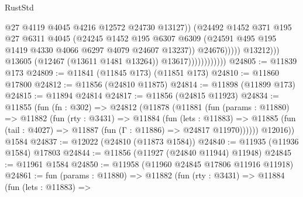\begin{lexlean}{RustStd}
\begin{coremodule}
                                              @27
                                              @4119
                                              @4045
                                              @4216
                                              @12572
                                              @24730
                                              @13127))
                                          (@24492
                                            @1452
                                            @371
                                            @195
                                            @27
                                            @6311
                                            @4045
                                            (@24245
                                              @1452
                                              @195
                                              @6307
                                              @6309
                                              (@24591
                                                @495
                                                @195
                                                @1419
                                                @4330
                                                @4066
                                                @6297
                                                @4079
                                                @24607
                                                @13237))
                                            @24676)))))
                                  @13212)))
                            @13605
                            (@12467 (@13611 @1481 @13264))
                            @13617))))))))))))
@24805 := @11839 @173
@24809 := @11841 (@11845 @173) (@11851 @173)
@24810 := @11860 @17800
@24812 := @11856 (@24810 @11875)
@24814 := @11898 (@11899 @173)
@24815 := @11894 @24814
@24817 := @11856 (@24815 @11923)
@24834 := @11855
    (fun (fn : @302) =>
    @24812
      (@11878
        (@11881
          (fun (params : @11880) =>
          @11882
            (fun (rty : @3431) =>
            @11884
              (fun (lets : @11883) =>
              @11885 (fun (tail : @4027) => @11887 (fun (Γ : @11886) => @24817 @11970))))))
        @12016))
    @1584
@24837 := @12022 (@24810 (@11873 @1584))
@24840 := @11935 (@11936 @1584) @17803
@24844 := @11856 (@11927 (@24840 @11944) @11948)
@24845 := @11961 @1584
@24850 := @11958 (@11960 @24845 @17806 @11916 @11918)
@24861 := fun (params : @11880) =>
  @11882
    (fun (rty : @3431) =>
    @11884
      (fun (lets : @11883) =>

\end{coremodule}
\end{lexlean}
